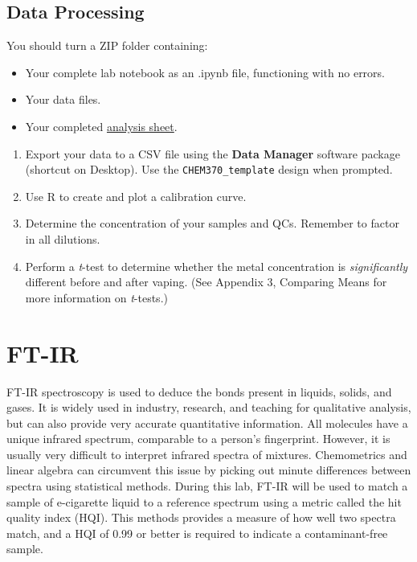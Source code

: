 \documentclass[]{tufte-book}
\providecommand{\tightlist}{%
  \setlength{\itemsep}{0pt}\setlength{\parskip}{0pt}}
\begin{document}
\hypertarget{data-processing-1}{%
\subsection{Data Processing}\label{data-processing-1}}

\begin{marginfigure}
You should turn a ZIP folder containing:

\begin{itemize}
\tightlist
\item
  Your complete lab notebook as an .ipynb file, functioning with no
  errors.\\
\item
  Your data files.\\
\item
  Your completed
  \href{https://github.com/alphonse/alphonse.github.io/raw/master/chem370/assignments/excel-templates/rotation_faas_data-analysis.xlsx}{analysis
  sheet}.
\end{itemize}
\end{marginfigure}

\begin{enumerate}
\def\labelenumi{\arabic{enumi}.}
\tightlist
\item
  Export your data to a CSV file using the \textbf{Data Manager} software package (shortcut on Desktop). Use the \texttt{CHEM370\_template} design when prompted.
\item
  Use R to create and plot a calibration curve.
\item
  Determine the concentration of your samples and QCs. Remember to factor in all dilutions.
\item
  Perform a \emph{t}-test to determine whether the metal concentration is \emph{significantly} different before and after vaping. (See Appendix 3, Comparing Means for more information on \emph{t}-tests.)
\end{enumerate}

\newpage

\hypertarget{ft-ir}{%
\section{FT-IR}\label{ft-ir}}

FT-IR spectroscopy is used to deduce the bonds present in liquids, solids, and gases. It is widely used in industry, research, and teaching for qualitative analysis, but can also provide very accurate quantitative information. All molecules have a unique infrared spectrum, comparable to a person's fingerprint. However, it is usually very difficult to interpret infrared spectra of mixtures. Chemometrics and linear algebra can circumvent this issue by picking out minute differences between spectra using statistical methods. During this lab, FT-IR will be used to match a sample of e-cigarette liquid to a reference spectrum using a metric called the hit quality index (HQI). This methods provides a measure of how well two spectra match, and a HQI of 0.99 or better is required to indicate a contaminant-free sample.
\end{document}
